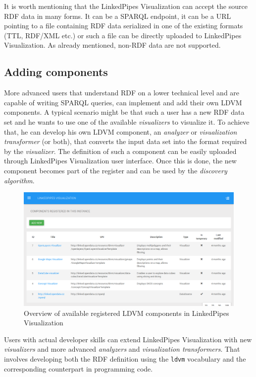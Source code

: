 It is worth mentioning that the LinkedPipes Visualization can accept the source RDF data in many forms. It can be a SPARQL endpoint, it can be a URL pointing to a file containing RDF data serialized in one of the existing formats (TTL, RDF/XML etc.) or such a file can be directly uploaded to LinkedPipes Visualization. As already mentioned, non-RDF data are not supported.

\subsection{Adding components}

More advanced users that understand RDF on a lower technical level and are capable of writing SPARQL queries, can implement and add their own LDVM components. A typical scenario might be that such a user has a new RDF data set and he wants to use one of the available \emph{visualizers} to visualize it. To achieve that, he can develop his own LDVM component, an \emph{analyzer} or \emph{visualization transformer} (or both), that converts the input data set into the format required by the \emph{visualizer}. The definition of such a component can be easily uploaded through LinkedPipes Visualization user interface. Once this is done, the new component becomes part of the register and can be used by the \emph{discovery algorithm}.

\begin{figure}
	\centering
	\includegraphics[width=130mm]{img/03_linked_pipes_components.png}
	\caption{Overview of available registered LDVM components in LinkedPipes Visualization} 
	\label{fig:linked-pipes-components}
\end{figure}

Users with actual developer skills can extend LinkedPipes Visualization with new \emph{visualizers} and more advanced \emph{analyzers} and \emph{visualization transformers}. That involves developing both the RDF definition using the \texttt{ldvm} vocabulary and the corresponding counterpart in programming code. 

